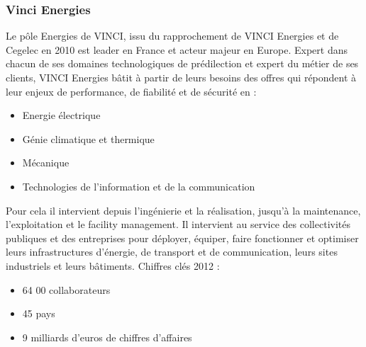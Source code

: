 \subsubsection{Vinci Energies}
	Le pôle Energies de VINCI, issu du rapprochement de VINCI Energies et de Cegelec en 2010 est leader en France et acteur majeur en Europe.
	Expert dans chacun de ses domaines technologiques de prédilection et expert du métier de ses clients, VINCI Energies bâtit à partir de leurs besoins des offres qui répondent à leur enjeux de performance, de fiabilité et de sécurité en :
\begin{itemize}
	\item Energie électrique
	\item Génie climatique et thermique
	\item Mécanique
	\item Technologies de l'information et de la communication
\end{itemize}
\bigbreak
	Pour cela il intervient depuis l'ingénierie et la réalisation, jusqu'à la maintenance, l'exploitation et le facility management. Il intervient au service des collectivités publiques et des entreprises pour déployer, équiper, faire fonctionner et optimiser leurs infrastructures d'énergie, de transport et de communication, leurs sites industriels et leurs bâtiments.
\newpage
Chiffres clés 2012 :
\begin{itemize}
	\item 64 00 collaborateurs
	\item 45 pays
	\item 9 milliards d'euros de chiffres d'affaires
\end{itemize}

